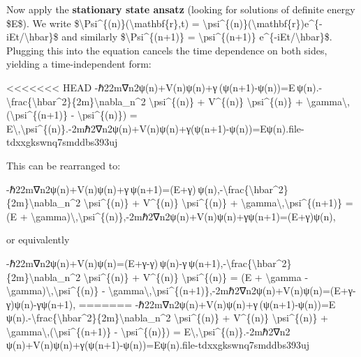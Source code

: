 \documentclass[]{article}
\begin{document}
Now apply the \textbf{stationary state ansatz} (looking for solutions of
definite energy \$E\$). We write
\$\textbackslash{}Psi\^{}\{(n)\}(\textbackslash{}mathbf\{r\},t) =
\textbackslash{}psi\^{}\{(n)\}(\textbackslash{}mathbf\{r\})e\^{}\{-iEt/\textbackslash{}hbar\}\$
and similarly \$\textbackslash{}Psi\^{}\{(n+1)\} =
\textbackslash{}psi\^{}\{(n+1)\} e\^{}\{-iEt/\textbackslash{}hbar\}\$​.
Plugging this into the equation cancels the time dependence on both
sides, yielding a time-independent form:

<<<<<<< HEAD
-ℏ22m∇n2ψ(n)+V(n)ψ(n)+γ (ψ(n+1)-ψ(n))=E ψ(n).-\textbackslash frac\{\textbackslash hbar\^{}2\}\{2m\}\textbackslash nabla\_n\^{}2
\textbackslash psi\^{}\{(n)\} + V\^{}\{(n)\}
\textbackslash psi\^{}\{(n)\} +
\textbackslash gamma\textbackslash,(\textbackslash psi\^{}\{(n+1)\} -
\textbackslash psi\^{}\{(n)\}) =
E\textbackslash,\textbackslash psi\^{}\{(n)\}.-2mℏ2\hspace{0pt}∇n2\hspace{0pt}ψ(n)+V(n)ψ(n)+γ(ψ(n+1)-ψ(n))=Eψ(n).\hspace{0pt}file-tdxxgkswnq7smddbs393uj\hspace{0pt}

This can be rearranged to:

-ℏ22m∇n2ψ(n)+V(n)ψ(n)+γ ψ(n+1)=(E+γ) ψ(n),-\textbackslash frac\{\textbackslash hbar\^{}2\}\{2m\}\textbackslash nabla\_n\^{}2
\textbackslash psi\^{}\{(n)\} + V\^{}\{(n)\}
\textbackslash psi\^{}\{(n)\} +
\textbackslash gamma\textbackslash,\textbackslash psi\^{}\{(n+1)\} = (E
+
\textbackslash gamma)\textbackslash,\textbackslash psi\^{}\{(n)\},-2mℏ2\hspace{0pt}∇n2\hspace{0pt}ψ(n)+V(n)ψ(n)+γψ(n+1)=(E+γ)ψ(n),

or equivalently

-ℏ22m∇n2ψ(n)+V(n)ψ(n)=(E+γ-γ) ψ(n)-γ ψ(n+1),-\textbackslash frac\{\textbackslash hbar\^{}2\}\{2m\}\textbackslash nabla\_n\^{}2
\textbackslash psi\^{}\{(n)\} + V\^{}\{(n)\}
\textbackslash psi\^{}\{(n)\} = (E + \textbackslash gamma -
\textbackslash gamma)\textbackslash,\textbackslash psi\^{}\{(n)\} -
\textbackslash gamma\textbackslash,\textbackslash psi\^{}\{(n+1)\},-2mℏ2\hspace{0pt}∇n2\hspace{0pt}ψ(n)+V(n)ψ(n)=(E+γ-γ)ψ(n)-γψ(n+1),
=======
-ℏ22m∇n2ψ(n)+V(n)ψ(n)+γ (ψ(n+1)-ψ(n))=E ψ(n).-\textbackslash{}frac\{\textbackslash{}hbar\^{}2\}\{2m\}\textbackslash{}nabla\_n\^{}2
\textbackslash{}psi\^{}\{(n)\} + V\^{}\{(n)\}
\textbackslash{}psi\^{}\{(n)\} +
\textbackslash{}gamma\textbackslash{},(\textbackslash{}psi\^{}\{(n+1)\}
- \textbackslash{}psi\^{}\{(n)\}) =
E\textbackslash{},\textbackslash{}psi\^{}\{(n)\}.-2mℏ2​∇n2​ψ(n)+V(n)ψ(n)+γ(ψ(n+1)-ψ(n))=Eψ(n).​file-tdxxgkswnq7smddbs393uj​
\end{document}
